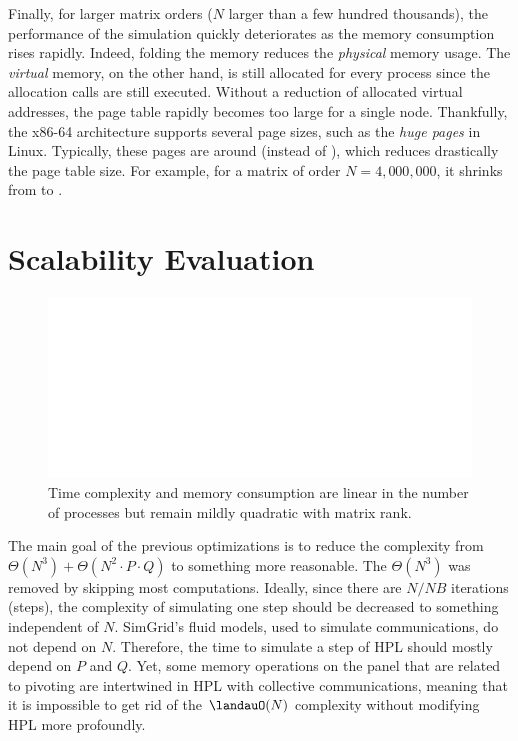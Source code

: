         Finally, for larger matrix orders (\ie \(N\) larger than a few hundred thousands), the performance of the
        simulation quickly deteriorates as the memory consumption rises rapidly. Indeed, folding the memory reduces the
        \emph{physical} memory usage. The \emph{virtual} memory, on the other hand, is still allocated for every process
        since the allocation calls are still executed.  Without a reduction of allocated virtual addresses, the page
        table rapidly becomes too large for a single node. Thankfully, the x86-64 architecture supports several page
        sizes, such as the \emph{huge pages} in Linux. Typically, these pages are around  (instead of
        ), which reduces drastically the page table size. For example, for a matrix of order
        \(N=4,000,000\), it shrinks from  to .

    \section{Scalability Evaluation}
        \begin{figure}[t]
            \centering
            \includegraphics[width=\linewidth,page=2]{./img/prediction/emulating/scalability_plot_size.pdf}
            \caption{Time complexity and memory consumption are linear in the number of processes but remain mildly
            quadratic with matrix rank.}
            \label{fig:hpl_scalability}
        \end{figure}

        The main goal of the previous optimizations is to reduce the complexity from \(\Theta(N^3) +
        \Theta(N^2\cdot{}P\cdot{}Q)\) to something more reasonable.  The \(\Theta(N^3)\) was removed by skipping most
        computations.  Ideally, since there are \(N/NB\) iterations (steps), the complexity of simulating one step
        should be decreased to something independent of \(N\). SimGrid's fluid models, used to simulate communications,
        do not depend on \(N\). Therefore, the time to simulate a step of HPL should mostly depend on \(P\) and \(Q\).
        Yet, some memory operations on the panel that are related to pivoting are intertwined in HPL with collective
        communications, meaning that it is impossible to get rid of the \(\landauO(N)\) complexity without modifying HPL more
        profoundly.


